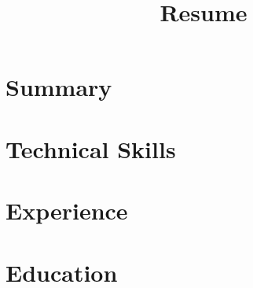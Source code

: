 \documentclass[10pt,a4paper]{article}
\begin{document}
\title{Resume}


\part{Summary}


\part{Technical Skills}


\part{Experience}


\part{Education}

\end{document}

